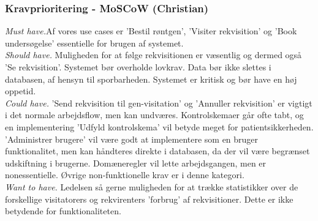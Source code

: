 \subsubsection*{Kravprioritering - MoSCoW (Christian)}
\indent\emph{Must have.}Af vores use cases er 'Bestil røntgen', 'Visiter
rekvisition' og 'Book undersøgelse' essentielle for brugen af systemet.\\
\emph{Should have.} Muligheden for at følge rekvisitionen er væsentlig og
dermed også 'Se rekvisition'. Systemet bør overholde lovkrav. Data bør ikke
slettes i databasen, af hensyn til sporbarheden. Systemet er kritisk og bør have
en høj oppetid.\\
\emph{Could have.} 'Send rekvisition til gen-visitation' og 'Annuller
rekvisition' er vigtigt i det normale arbejdsflow, men kan undværes.
Kontrolskemaer går ofte tabt, og en implementering 'Udfyld kontrolskema' vil
betyde meget for patientsikkerheden. 'Administrer brugere' vil være godt at
implementere som en bruger funktionalitet, men kan håndteres direkte i
databasen, da der vil være begrænset udskiftning i brugerne. Domæneregler vil
lette arbejdsgangen, men er nonessentielle. Øvrige non-funktionelle krav er i
denne kategori.\\
\emph{Want to have.} Ledelsen så gerne muligheden for at trække
statistikker over de forskellige visitatorers og rekvirenters 'forbrug' af
rekvisitioner. Dette er ikke betydende for funktionaliteten.
